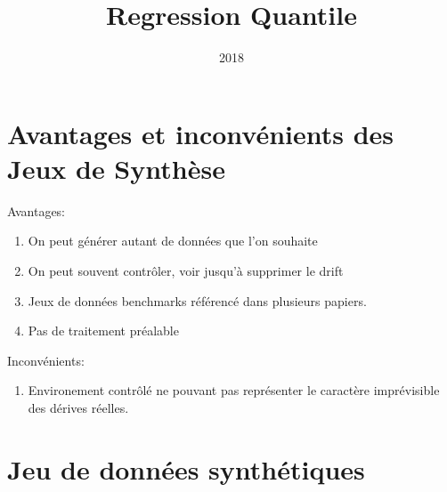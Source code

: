 \documentclass[11pt,a4paper]{report}
\title{Regression Quantile}
\date{2018}
\begin{document}







\section*{Avantages et inconvénients des Jeux de Synthèse}

Avantages:
\begin{enumerate}
\item On peut générer autant de données que l’on souhaite
\item On peut souvent contrôler, voir jusqu'à supprimer le drift
\item Jeux de données benchmarks référencé dans plusieurs papiers.
\item Pas de traitement préalable
\end{enumerate}

Inconvénients:
\begin{enumerate}
\item Environement contrôlé ne pouvant pas représenter le caractère imprévisible des dérives réelles.
\end{enumerate}
\section*{Jeu de données synthétiques}
\end{document}

